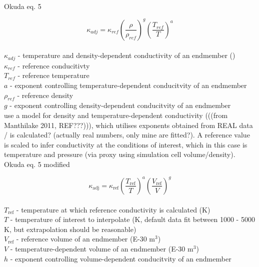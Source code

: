 \cite{Okuda2017}\\

Okuda eq. 5 

\begin{equation}%
\kappa_{adj}=\kappa_{ref}\left ( \frac{\rho}{\rho_{ref}} \right )^{g}\left ( \frac{T_{ref}}{T} \right )^{a}
\label{eq.okuda5}
\end{equation}%
\\ $\kappa_{adj}$ - temperature and density-dependent conductivity of an endmember (\wmk)\\
$\kappa_{ref}$ - reference conducitivty\\
$T_{ref}$ - reference temperature\\
$a$ - exponent controlling temperature-dependent conducitvity of an endmember\\
$\rho_{ref}$ - reference density\\
$g$ - exponent controlling density-dependent conducitvity of an endmember\\

\citet{Okuda2017} use a model for density and temperature-dependent conductivity (((from Manthilake 2011, REF???))), which utilises exponents obtained from REAL data / is calculated? (actually real numbers, only mine are fitted?). A reference value is scaled to infer conductivity at the conditions of interest, which in this case is temperature and pressure (via proxy using simulation cell volume/density).\\



Okuda eq. 5 modified

\begin{equation}%
\kappa_{\mathrm{adj}}=\kappa_{\mathrm{ref}}\left ( \frac{T_{\mathrm{ref}}}{T} \right )^{a}\left ( \frac{V_{\mathrm{ref}}}{V} \right )^{g}
\label{eq.okuda5_mod}
\end{equation}%
\\ $T_{\mathrm{ref}}$ - temperature at which reference conductivity is calculated (K)\\
$T$ - temperature of interest to interpolate (K, default data fit between 1000 - 5000 K, but extrapolation should be reasonable)\\   
$V_{\mathrm{ref}}$ - reference volume of an endmember (E-30 m$^3$)\\
$V$ - temperature-dependent volume of an endmember (E-30 m$^3$)\\
$h$ - exponent controlling volume-dependent conducitvity of an endmember\\

